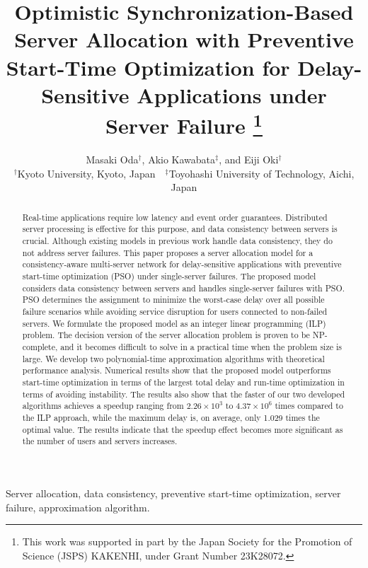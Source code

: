 \documentclass[10pt, letterpaper]{IEEEtran}
\newcommand\red[1]{\textcolor{red}{#1}}
\begin{document}
\begin{CJK}{UTF8}{ipxm}

\title{\Large
Optimistic Synchronization-Based Server Allocation with Preventive Start-Time Optimization for Delay-Sensitive Applications under Server Failure
\thanks{This work was supported in part by the Japan Society for the Promotion of Science (JSPS) KAKENHI, under Grant Number 23K28072.}
}
\author{Masaki Oda$^\dag$, Akio Kawabata$^\ddag$, and Eiji Oki$^\dag$\\
$^\dag$Kyoto University, Kyoto, Japan\ \ $^\ddag$Toyohashi University of Technology, Aichi, Japan} 
\maketitle

\begin{abstract}
Real-time applications require low latency and event order guarantees.  
Distributed server processing is effective for this purpose, and data consistency between servers is crucial.  
Although existing models in previous work handle data consistency, they do not address server failures.  
This paper proposes a server allocation model for a consistency-aware multi-server network for delay-sensitive applications with preventive start-time optimization (PSO) under single-server failures.
The proposed model considers data consistency between servers and handles single-server failures with PSO.
PSO determines the assignment to minimize the worst-case delay over all possible failure scenarios while avoiding service disruption for users connected to non-failed servers.  
We formulate the proposed model as an integer linear programming (ILP) problem.  
The decision version of the server allocation problem is proven to be NP-complete, and it becomes difficult to solve in a practical time when the problem size is large.  
We develop two polynomial-time approximation algorithms with theoretical performance analysis. 
Numerical results show that the proposed model outperforms start-time optimization in terms of the largest total delay and run-time optimization in terms of avoiding instability.  
The results also show that the faster of our two developed algorithms achieves a speedup ranging from $2.26 \times 10^3$ to $4.37 \times 10^6$ times compared to the ILP approach, while the maximum delay is, on average, only 1.029 times the optimal value.
The results indicate that the speedup effect becomes more significant as the number of users and servers increases.
\end{abstract}
\begin{IEEEkeywords}
  Server allocation, data consistency, preventive start-time optimization, server failure, approximation algorithm.
\end{IEEEkeywords}


\end{CJK}
\end{document}
